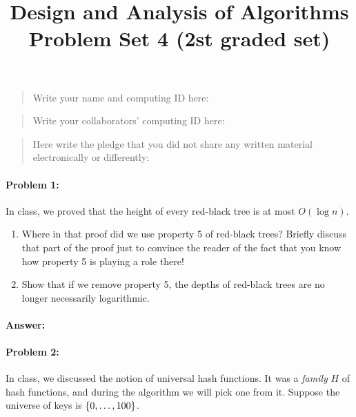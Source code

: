 \documentclass{article}
\title{Design and Analysis of Algorithms\\ {\bf Problem Set 4 (2st graded set)}}
\author{}
\begin{document}
\maketitle

\begin{quote}
    Write your name and computing ID here:
\end{quote}

\vspace{20px}

\begin{quote}
    Write your collaborators' computing ID here:
\end{quote}

\vspace{20px}

\begin{quote}
    Here write the pledge that you did not share any written material electronically or differently:
\end{quote}

\newpage
\paragraph{Problem 1:} In class, we proved that the height of every red-black tree is at most $O(\log n)$. 

\begin{enumerate}[label=\alph*]
\item Where in that proof did we use property 5 of red-black trees? Briefly discuss that part of the proof just to convince the reader of the fact that you know how property 5 is playing a role there! 

\item Show that if we remove property 5, the depths of red-black trees are no longer necessarily logarithmic.
\end{enumerate}

\paragraph{Answer:}


\newpage
\paragraph{Problem 2:} 
In class, we discussed the notion of universal hash functions. It was a \emph{family} $H$ of hash functions, and during the algorithm we will pick one from it. Suppose the universe of keys is $\{ 0,\dots,100 \}$. 
\end{document}

